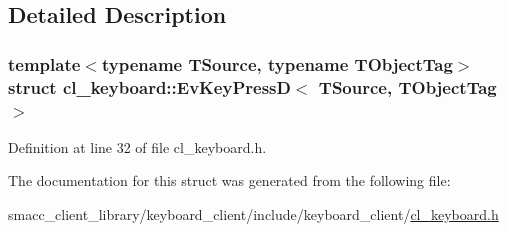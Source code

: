 \subsection{Detailed Description}
\subsubsection*{template$<$typename T\+Source, typename T\+Object\+Tag$>$\newline
struct cl\+\_\+keyboard\+::\+Ev\+Key\+Press\+D$<$ T\+Source, T\+Object\+Tag $>$}



Definition at line 32 of file cl\+\_\+keyboard.\+h.



The documentation for this struct was generated from the following file\+:\begin{DoxyCompactItemize}
\item 
smacc\+\_\+client\+\_\+library/keyboard\+\_\+client/include/keyboard\+\_\+client/\hyperlink{cl__keyboard_8h}{cl\+\_\+keyboard.\+h}\end{DoxyCompactItemize}

